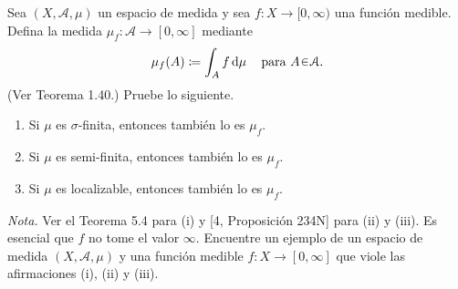 \setcounter{neje}{35}
\begin{nejer}
Sea $(X, \mathcal{A}, \mu)$ un espacio de medida y sea $f \colon X \to [0, \infty)$ una función medible. Defina la medida $\mu_f \colon \mathcal{A} \to [0, \infty]$ mediante
$$
\mu_f(A) \coloneq \int_A f \dd{\mu} \quad \text{para } A \en \mathcal{A}.
$$
(Ver Teorema 1.40.) Pruebe lo siguiente.
\begin{enumerate}[label = (\roman*), leftmargin=1.8em]
    \item Si $\mu$ es $\sigma$-finita, entonces también lo es $\mu_f$.
    \item Si $\mu$ es semi-finita, entonces también lo es $\mu_f$.
    \item Si $\mu$ es localizable, entonces también lo es $\mu_f$.
\end{enumerate}
\emph{Nota.} Ver el Teorema 5.4 para (i) y [4, Proposición 234N] para (ii) y (iii). Es esencial que $f$ no tome el valor $\infty$. Encuentre un ejemplo de un espacio de medida $(X, \mathcal{A}, \mu)$ y una función medible $f \colon X \to [0, \infty]$ que viole las afirmaciones (i), (ii) y (iii).



\end{nejer}
